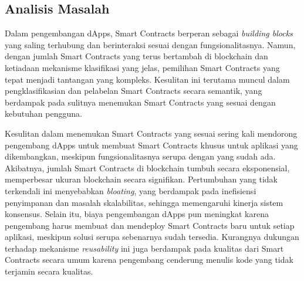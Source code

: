\subsection{Analisis Masalah}
\label{subsec:analisis-masalah}

Dalam pengembangan dApps, Smart Contracts berperan sebagai \textit{building blocks} yang saling terhubung dan berinteraksi sesuai dengan fungsionalitasnya. Namun, dengan jumlah Smart Contracts yang terus bertambah di blockchain dan ketiadaan mekanisme klasifikasi yang jelas, pemilihan Smart Contracts yang tepat menjadi tantangan yang kompleks. Kesulitan ini terutama muncul dalam pengklasifikasian dan pelabelan Smart Contracts secara semantik, yang berdampak pada sulitnya menemukan Smart Contracts yang sesuai dengan kebutuhan pengguna.

Kesulitan dalam menemukan Smart Contracts yang sesuai sering kali mendorong pengembang dApps untuk membuat Smart Contracts khusus untuk aplikasi yang dikembangkan, meskipun fungsionalitasnya serupa dengan yang sudah ada. Akibatnya, jumlah Smart Contracts di blockchain tumbuh secara eksponensial, memperbesar ukuran blockchain secara signifikan. Pertumbuhan yang tidak terkendali ini menyebabkan \textit{bloating}, yang berdampak pada inefisiensi penyimpanan dan masalah skalabilitas, sehingga memengaruhi kinerja sistem konsensus. Selain itu, biaya pengembangan dApps pun meningkat karena pengembang harus membuat dan mendeploy Smart Contracts baru untuk setiap aplikasi, meskipun solusi serupa sebenarnya sudah tersedia. Kurangnya dukungan terhadap mekanisme \textit{reusability} ini juga berdampak pada kualitas dari Smart Contracts secara umum karena pengembang cenderung menulis kode yang tidak terjamin secara kualitas.







% 
